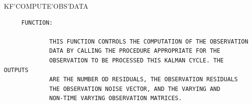 \begin{frame}
KF'COMPUTE'OBS'DATA
\begin{verbatim}
     FUNCTION:

             THIS FUNCTION CONTROLS THE COMPUTATION OF THE OBSERVATION
             DATA BY CALLING THE PROCEDURE APPROPRIATE FOR THE
             OBSERVATION TO BE PROCESSED THIS KALMAN CYCLE. THE OUTPUTS
             ARE THE NUMBER OD RESIDUALS, THE OBSERVATION RESIDUALS
             THE OBSERVATION NOISE VECTOR, AND THE VARYING AND
             NON-TIME VARYING OBSERVATION MATRICES.


\end{verbatim}
\end{frame}
